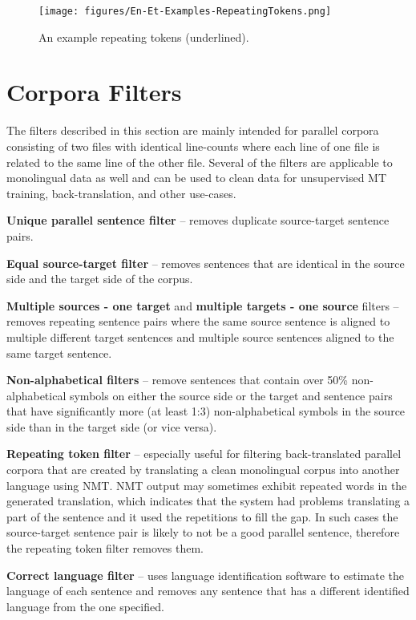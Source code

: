\documentclass{IOS-Book-Article}
\begin{document}
\begin{figure}[ht]
  \texttt{[image: figures/En-Et-Examples-RepeatingTokens.png]}
  \caption{An example repeating tokens (underlined).}
  \label{fig:RepeatingTokens}
\end{figure}

\section{Corpora Filters} 
\label{sec:filters}

The filters described in this section are mainly intended for parallel corpora consisting of two files with identical line-counts where each line of one file is related to the same line of the other file. Several of the filters are applicable to monolingual data as well and can be used to clean data for unsupervised MT training, back-translation, and other use-cases.

\textbf{Unique parallel sentence filter} -- removes duplicate source-target sentence pairs.

\textbf{Equal source-target filter} -- removes sentences that are identical in the source side and the target side of the corpus.

\textbf{Multiple sources - one target} and \textbf{multiple targets - one source} filters -- removes repeating sentence pairs where the same source sentence is aligned to multiple different target sentences and multiple source sentences aligned to the same target sentence.

\textbf{Non-alphabetical filters} -- remove sentences that contain over 50\% non-alphabetical symbols on either the source side or the target and sentence pairs that have significantly more (at least 1:3) non-alphabetical symbols in the source side than in the target side (or vice versa).

\textbf{Repeating token filter} -- especially useful for filtering back-translated parallel corpora that are created by translating a clean monolingual corpus into another language using NMT. NMT output may sometimes exhibit repeated words in the generated translation, which indicates that the system had problems translating a part of the sentence and it used the repetitions to fill the gap. In such cases the source-target sentence pair is likely to not be a good parallel sentence, therefore the repeating token filter removes them.

\textbf{Correct language filter} -- uses language identification software \cite{Lui2012Langid.py:Tool} to estimate the language of each sentence and removes any sentence that has a different identified language from the one specified.
\end{document}
